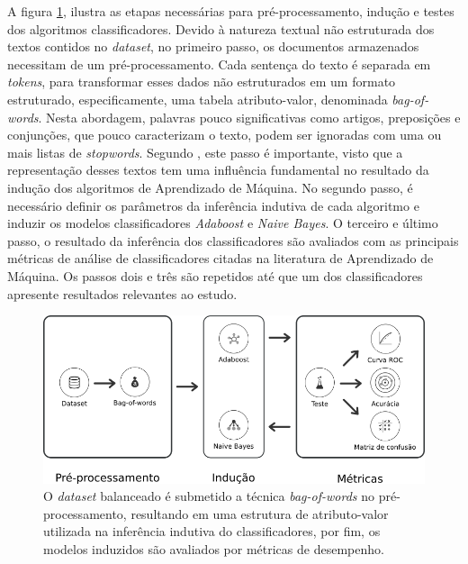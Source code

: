 A figura \ref{figure:metodologia_3}, ilustra as etapas necessárias para 
pré-processamento, indução e testes dos algoritmos classificadores. Devido à 
natureza textual não estruturada dos textos contidos no \textit{dataset}, no 
primeiro passo, os documentos armazenados necessitam de um pré-processamento. 
Cada sentença do texto é separada em \textit{tokens}, para transformar esses 
dados não estruturados em um formato estruturado, especificamente, uma tabela 
atributo-valor, denominada \textit{bag-of-words}. Nesta abordagem, palavras 
pouco significativas como artigos, preposições e conjunções, que pouco 
caracterizam o texto, podem ser ignoradas com uma ou mais listas de 
\textit{stopwords}. Segundo , este passo é 
importante, visto que a representação desses textos tem uma influência 
fundamental no resultado da indução dos algoritmos de Aprendizado de Máquina. 
No segundo passo, é necessário definir os parâmetros da inferência indutiva de 
cada algoritmo e induzir os modelos classificadores \textit{Adaboost} e 
\textit{Naive Bayes}. O terceiro e último passo, o resultado da inferência dos 
classificadores são avaliados com as principais métricas de análise de 
classificadores citadas na literatura de Aprendizado de Máquina. Os passos dois 
e três são repetidos até que um dos classificadores apresente resultados 
relevantes ao estudo.

\begin{figure}[H]
\begin{center}
    \includegraphics[scale=0.60]{images/metodologia_3.png}
\end{center}
\caption{O \textit{dataset} balanceado é submetido a técnica 
\textit{bag-of-words} no pré-processamento, resultando em uma estrutura de 
atributo-valor utilizada na inferência indutiva do classificadores, por fim, os 
modelos induzidos são avaliados por métricas de desempenho.}
\label{figure:metodologia_3}
\end{figure}

